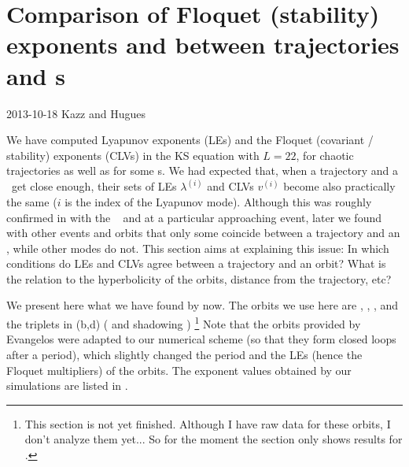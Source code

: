 \section{Comparison of Floquet (stability) exponents
  and {\cLvs} between trajectories and \po s}
\label{sec:KS-CompLyapVec}

\begin{description}
\item[2013-10-18 Kazz and Hugues]
\end{description}


We have computed Lyapunov exponents (LEs)
and the Floquet (covariant / stability) exponents (CLVs)
in the KS equation with $L=22$,
for chaotic trajectories as well as for some \po s.
We had expected that, when a trajectory and a \po\ get close enough,
their sets of LEs $\lambda^{(i)}$ and CLVs $v^{(i)}$
become also practically the same
($i$ is the index of the Lyapunov mode).
Although this was roughly confirmed in 
with the \po\  and at a particular approaching event,
later we found with other events and orbits that
only some {\cLvs} coincide between a trajectory and an \po,
while other modes do not.
This section aims at explaining this issue:
In which conditions do LEs and CLVs agree between a trajectory and an orbit?
What is the relation to the hyperbolicity of the orbits,
distance from the trajectory, etc?

We present here what we have found by now.
The orbits we use here are , , ,
and the triplets in (b,d)
( and  shadowing )
\footnote{
  This section is not yet finished.
  Although I have raw data for these orbits, I don't analyze them yet...
  So for the moment the section only shows results for \PO{10.25}.
}
Note that the orbits provided by Evangelos
were adapted to our numerical scheme
(so that they form closed loops after a period),
which slightly changed the period and the LEs
(hence the Floquet multipliers) of the orbits.
The exponent values obtained by our simulations
are listed in .

